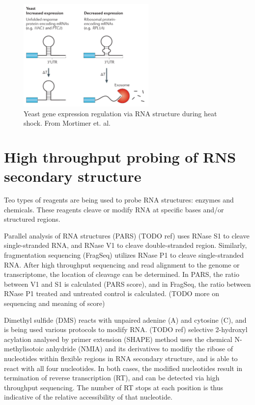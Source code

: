 \documentclass{proposal}
\begin{document}
\begin{figure}[h!]
    \centering
    \includegraphics[width=0.6\textwidth]{yeast_stability.png}
    \caption{Yeast gene expression regulation via RNA structure during heat shock. From Mortimer et. al\cite{mortimer2014insights}.}
    \label{fig:yeast_stability}
    \centering
\end{figure}


\section{High throughput probing of RNS secondary structure}

Teo types of reagents are being used to probe RNA structures: enzymes and chemicals.
These reagents cleave or modify RNA at specific bases and/or structured regions.

﻿Parallel analysis of RNA structures (PARS) (TODO ref)
﻿uses RNase S1 to cleave single-stranded RNA, and RNase V1 to cleave double-stranded region.
Similarly, ﻿fragmentation sequencing (FragSeq) utilizes ﻿RNase P1 to cleave single-stranded RNA.
After high throughput sequencing and read alignment to the genome or transcriptome,
the location of cleavage can be determined.
In PARS, the ratio between V1 and S1 is calculated (PARS score),
and in FragSeq, the ratio between ﻿RNase P1 treated and untreated control is calculated. (TODO more on sequencing and meaning of score)


﻿Dimethyl sulfide (DMS) reacts with ﻿unpaired adenine (A) and cytosine (C),
and is being used various protocols to modify RNA. (TODO ref)
﻿selective 2-hydroxyl acylation analysed by primer extension (SHAPE)
method uses the chemical N-methylisotoic anhydride (NMIA) and its derivatives to
modifiy the ribose of nucleotides within flexible regions in RNA secondary structure,
and is able to react with all four nucleotides.
In both cases, the modified nucleotides result in ﻿termination of reverse transcription (RT),
and can be detected via high throughput sequencing.
The number of RT stops at each position is thus indicative of the relative accessibility of that nucleotide.
\end{document}

